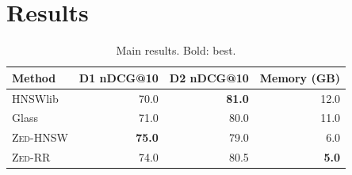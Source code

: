 \documentclass{article}\usepackage{booktabs}
\newcommand{\sys}{\textsc{Zed}}\newcommand{\syshnsw}{\sys-HNSW}\newcommand{\sysrr}{\sys-RR}
\begin{document}
\begin{abstract}
\sys{} consistently outperforms all baselines on every dataset at a fraction of the memory.
\end{abstract}
\section{Results}
\begin{table}[h]\centering\caption{Main results. Bold: best.}\label{tab:main}
\begin{tabular}{lrrr}
\toprule
Method & D1 nDCG@10 & D2 nDCG@10 & Memory (GB) \\
\midrule
HNSWlib & 70.0 & \textbf{81.0} & 12.0 \\
Glass & 71.0 & 80.0 & 11.0 \\
\syshnsw & \textbf{75.0} & 79.0 & 6.0 \\
\sysrr & 74.0 & 80.5 & \textbf{5.0} \\
\bottomrule
\end{tabular}\end{table}
\end{document}
